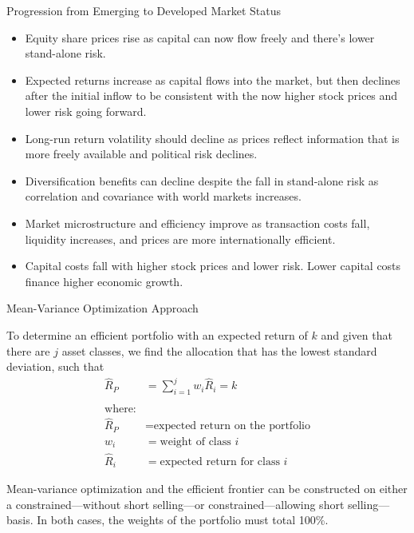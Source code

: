 \documentclass[../custom]{flashcards}
\newcommand{\studyArea}{Asset Allocation}
\begin{document}
\begin{flashcard}[\studyArea]{Progression from Emerging to Developed Market Status}
    \begin{itemize}
        \item Equity share prices rise as capital can now flow freely and there's lower stand-alone risk.
        \item Expected returns increase as capital flows into the market, but then declines after the initial inflow to be consistent with the now higher stock prices and lower risk going forward.
        \item Long-run return volatility should decline as prices reflect information that is more freely available and political risk declines.
        \item Diversification benefits can decline despite the fall in stand-alone risk as correlation and covariance with world markets increases.
        \item Market microstructure and efficiency improve as transaction costs fall, liquidity increases, and prices are more internationally efficient.
        \item Capital costs fall with higher stock prices and lower risk. Lower capital costs finance higher economic growth.
    \end{itemize}
\end{flashcard}

\begin{flashcard}[\studyArea]{Mean-Variance Optimization Approach}
    \begin{flushleft}
        To determine an efficient portfolio with an expected return of $k$ and given that there are $j$ asset classes, we find the allocation that has the lowest standard deviation, such that
        \begin{align*}
            \hat{R}_P &= \sum_{i=1}^j w_i \hat{R}_i = k\\
            \\
            \text{where:}\\
            \hat{R}_P &= \text{expected return on the portfolio}\\
            w_i &= \text{weight of class $i$}\\
            \hat{R}_i &= \text{expected return for class $i$}
        \end{align*}

        Mean-variance optimization and the efficient frontier can be constructed on either a constrained---without short selling---or constrained---allowing short selling---basis. In both cases, the weights of the portfolio must total 100\%.
    \end{flushleft}
\end{flashcard}
\end{document}
